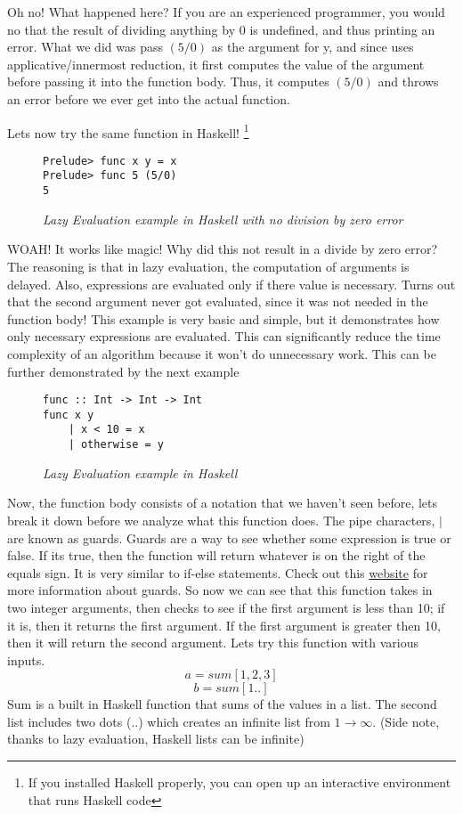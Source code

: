 \documentclass{article}
\begin{document}
\medskip\noindent
Oh no! What happened here? If you are an experienced programmer, you would no that the result of dividing anything by 0 is undefined, and thus printing an error. What we did was pass $(5/0)$ as the argument for y, and since uses applicative/innermost reduction, it first computes the value of the argument before passing it into the function body. Thus, it computes $(5/0)$ and throws an error before we ever get into the actual function. 

\medskip\noindent
Lets now try the same function in Haskell! \footnote{If you installed Haskell properly, you can open up an interactive environment that runs Haskell code}

\begin{figure}[H]
    \begin{lstlisting}
Prelude> func x y = x
Prelude> func 5 (5/0)
5
    \end{lstlisting}
    \caption{\textit{Lazy Evaluation example in Haskell with no division by zero error}}
\end{figure}

\medskip\noindent
WOAH! It works like magic! Why did this not result in a divide by zero error? The reasoning is that in lazy evaluation, the computation of arguments is delayed. Also, expressions are evaluated only if there value is necessary. Turns out that the second argument never got evaluated, since it was not needed in the function body! This example is very basic and simple, but it demonstrates how only necessary expressions are evaluated. This can significantly reduce the time complexity of an algorithm because it won't do unnecessary work. This can be further demonstrated by the next example

\begin{figure}[H]
    \begin{lstlisting}
func :: Int -> Int -> Int
func x y 
    | x < 10 = x
    | otherwise = y
    \end{lstlisting}
    \caption{\textit{Lazy Evaluation example in Haskell}}
\end{figure}

\medskip\noindent
Now, the function body consists of a notation that we haven't seen before, lets break it down before we analyze what this function does. The pipe characters, $|$ are known as guards. Guards are a way to see whether some expression is true or false. If its true, then the function will return whatever is on the right of the equals sign. It is very similar to if-else statements. Check out this \href{http://learnyouahaskell.com/syntax-in-functions#guards-guards}{website} for more information about guards. So now we can see that this function takes in two integer arguments, then checks to see if the first argument is less than 10; if it is, then it returns the first argument. If the first argument is greater then 10, then it will return the second argument. Lets try this function with various inputs. $$a = sum [1,2,3]$$ $$b = sum [1..]$$ Sum is a built in Haskell function that sums of the values in a list. The second list includes two dots ($..$) which creates an infinite list from $1 \rightarrow \infty$. (Side note, thanks to lazy evaluation, Haskell lists can be infinite)
\end{document}
